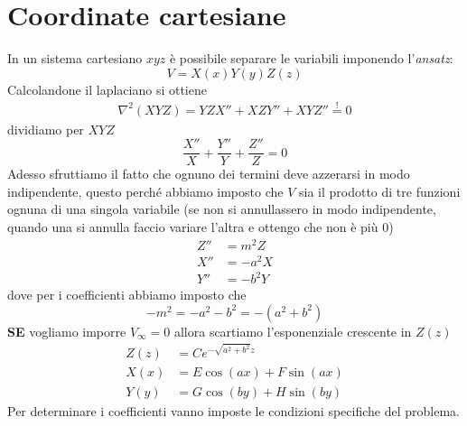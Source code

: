 \section{Coordinate cartesiane}
In un sistema cartesiano $ xyz $ è possibile separare le variabili imponendo l'\textit{ansatz}:
\begin{equation}
  V = X(x) Y(y) Z(z)
\end{equation}
Calcolandone il laplaciano si ottiene
\begin{align}
  \nabla^2 \left( X Y Z \right) = Y Z X'' + X Z Y'' + X Y Z'' \overset{!}{=} 0
\end{align}
dividiamo per $ XYZ $
\begin{equation}
  \frac{X''}{X} + \frac{ Y''}{ Y} + \frac{ Z''}{ Z} = 0
\end{equation}
Adesso sfruttiamo il fatto che ognuno dei termini deve azzerarsi in modo indipendente, questo perché abbiamo 
imposto che $ V $ sia il prodotto di tre funzioni ognuna di una singola variabile (se non si annullassero in modo indipendente, 
quando una si annulla faccio variare l'altra e ottengo che non è più $ 0 $)
\begin{align}
  Z'' &= m^2 Z
  \\
  X'' &= -a^2 X
  \\
  Y'' &= -b^2 Y
\end{align}
dove per i coefficienti abbiamo imposto che
\begin{equation}
  -m^2 = -a^2 -b^2 = -(a^2 + b^2)
\end{equation}
\textbf{SE} vogliamo imporre $ V_{\infty} = 0 $ allora scartiamo l'esponenziale crescente in $ Z(z) $
\begin{align}
  Z (z) &= C e^{- \sqrt{a^2 + b^2} z}
  \\
  X(x) &= E \cos(ax) + F \sin (ax)
  \\
  Y(y) &= G \cos(by) + H \sin (by)
\end{align}
Per determinare i coefficienti vanno imposte le condizioni specifiche del problema.
